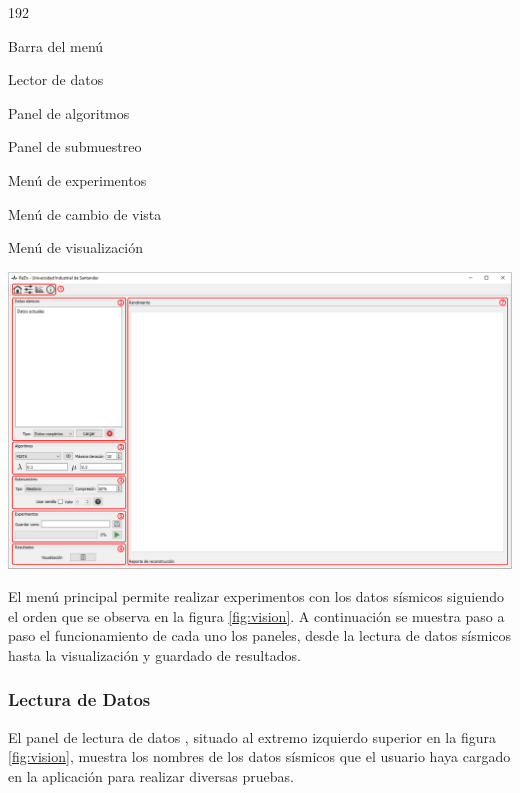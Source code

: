 \documentclass[12pt,twoside,letter]{ol-softwaremanual}
\newcommand*\circled[1]{\tikz[baseline=(char.base)]{
            \node[shape=circle,draw,inner sep=2pt] (char) {#1};}}
\newenvironment{Figure}
  {\par\medskip\noindent\minipage{\linewidth}}
  {\endminipage\par\medskip}
\begin{document}
\begin{dingautolist}{192}
	\setlength\itemsep{0em}
	\item Barra del menú
	\item Lector de datos
	\item Panel de algoritmos
	\item Panel de submuestreo
	\item Menú de experimentos
	\item Menú de cambio de vista
	\item Menú de visualización
\end{dingautolist}

\begin{Figure}
	\centering
	\includegraphics[width=1\linewidth]{figures/vision_v2}
	\label{fig:vision}
\end{Figure}



El menú principal permite realizar experimentos con los datos sísmicos siguiendo el orden que se observa en la figura \ref{fig:vision}. A continuación se muestra paso a paso el funcionamiento de cada uno los paneles, desde la lectura de datos sísmicos hasta la visualización y guardado de resultados.

\subsubsection{Lectura de Datos}

El panel de lectura de datos \circled{2}, situado al extremo izquierdo superior en la figura \ref{fig:vision}, muestra los nombres de los datos sísmicos que el usuario haya cargado en la aplicación para realizar diversas pruebas.\\
\end{document}
